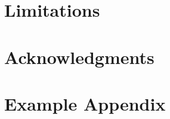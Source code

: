 \documentclass[11pt]{article}
\begin{document}
\section*{Limitations}


\section*{Acknowledgments}

%


\appendix

\section{Example Appendix}
\label{sec:appendix}
\end{document}
